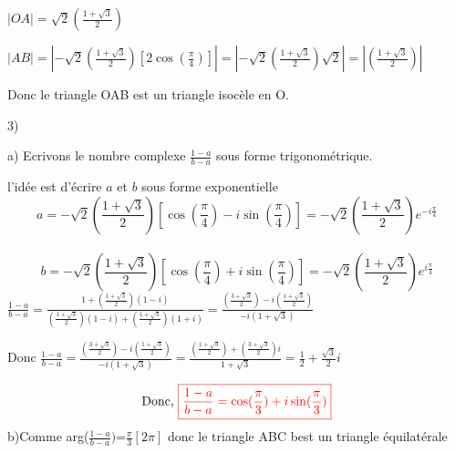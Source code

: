 \documentclass[12pt]{article}
\begin{document}
$|OA|=\sqrt{2}\left( \frac{1+\sqrt{3}}{2}\right)$

$|AB|=|-\sqrt{2}(\frac{1+\sqrt{3}}{2})\left[2\cos(\frac{\pi}{4})\right]|=|-\sqrt{2}(\frac{1+\sqrt{3}}{2})\sqrt{2}|=|(\frac{1+\sqrt{3}}{2})|$

Donc le triangle OAB est un triangle isocèle en O.

3) 

a) Ecrivons le nombre complexe $\frac{1-a}{b-a}$  sous forme trigonométrique.

l'idée est d'écrire $a$ et $b$ sous forme exponentielle \\

\[a=-\sqrt{2}\left( \frac{1+\sqrt{3}}{2}\right) \left[\cos(\frac{\pi}{4})-i\sin(\frac{\pi}{4})\right]=-\sqrt{2}\left( \frac{1+\sqrt{3}}{2}\right)e^{-i\frac{\pi}{4}}\]\\
\[b=-\sqrt{2}\left( \frac{1+\sqrt{3}}{2}\right) \left[\cos(\frac{\pi}{4})+i\sin(\frac{\pi}{4})\right]=-\sqrt{2}\left( \frac{1+\sqrt{3}}{2}\right)e^{i\frac{\pi}{4}}\]
$\frac{1-a}{b-a}=\frac{1+(\frac{1+\sqrt{3}}{2})(1-i)}{(\frac{1+\sqrt{3}}{2})(1-i)+(\frac{1+\sqrt{3}}{2})(1+i)}=
\frac{\left( \frac{3+\sqrt{3}}{2}\right) -i\left(\frac{1+\sqrt{3}}{2}\right)}{-i\left( 1+\sqrt{3}\right) }$


Donc $\frac{1-a}{b-a}=\frac{\left( \frac{3+\sqrt{3}}{2}\right) -i\left(\frac{1+\sqrt{3}}{2}\right)}{-i\left( 1+\sqrt{3}\right)}=\frac{\left(\frac{1+\sqrt{3}}{2}\right)+\left(\frac{3+\sqrt{3}}{2}\right)i}{1+\sqrt{3}}=\frac{1}{2}+\frac{\sqrt{3}}{2}i$

\[\text{Donc, }\color{red}{\boxed{\frac{1-a}{b-a}=\cos(\frac{\pi}{3})+i\sin(\frac{\pi}{3})}}\]
b)Comme arg($\frac{1-a}{b-a})$=$\frac{\pi}{3}[2\pi]$ donc le triangle ABC best un triangle équilatérale

\end{document}
